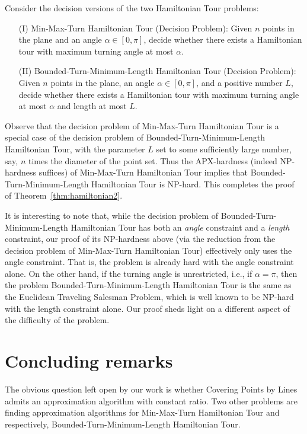 \documentclass[letterpaper,11pt]{article}
\def\ie{{i.e.}}
\begin{document}
\medskip
Consider the decision versions of the two Hamiltonian Tour problems:
\begin{itemize} \itemsep -1pt
\item[(I)]
{\sc Min-Max-Turn Hamiltonian Tour} (Decision Problem):
Given $n$ points in the plane and an angle $\alpha \in [0,\pi]$,
decide whether there exists a Hamiltonian tour with maximum turning angle
at most $\alpha$.
\item[(II)]
{\sc Bounded-Turn-Minimum-Length Hamiltonian Tour} (Decision Problem):
Given $n$ points in the plane, an angle $\alpha \in [0,\pi]$,
and a positive number $L$,
decide whether there exists a Hamiltonian tour with maximum turning angle
at most $\alpha$ and length at most $L$.
\end{itemize}
Observe that the decision problem of 
{\sc Min-Max-Turn Hamiltonian Tour}
is a special case of the decision problem of
{\sc Bounded-Turn-Minimum-Length Hamiltonian Tour},
with the parameter $L$ set to some sufficiently large number,
say, $n$ times the diameter of the point set.
Thus the APX-hardness (indeed NP-hardness suffices)
of {\sc Min-Max-Turn Hamiltonian Tour}
implies that {\sc Bounded-Turn-Minimum-Length Hamiltonian Tour} is NP-hard.
This completes the proof of Theorem~\ref{thm:hamiltonian2}.

\medskip
It is interesting to note that,
while the decision problem of {\sc Bounded-Turn-Minimum-Length Hamiltonian Tour}
has both an \emph{angle} constraint and a \emph{length} constraint,
our proof of its NP-hardness above
(via the reduction from the decision problem of {\sc Min-Max-Turn Hamiltonian Tour})
effectively only uses the angle constraint.
That is, the problem is already hard with the angle constraint alone.
On the other hand,
if the turning angle is unrestricted, \ie, if $\alpha = \pi$,
then the problem {\sc Bounded-Turn-Minimum-Length Hamiltonian Tour}
is the same as the {\sc Euclidean Traveling Salesman Problem},
which is well known to be NP-hard with the length constraint alone.
Our proof
sheds light on a different aspect of the difficulty of the problem.


\section{Concluding remarks}

The obvious question left open by our work is whether 
{\sc Covering Points by Lines} admits an approximation algorithm with
constant ratio. 
Two other problems are finding approximation algorithms for 
{\sc Min-Max-Turn Hamiltonian Tour} and respectively, 
{\sc Bounded-Turn-Minimum-Length Hamiltonian Tour}.
\end{document}
